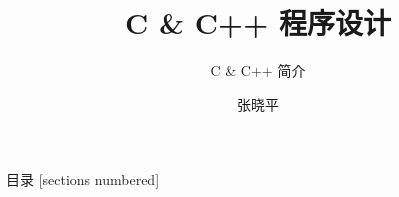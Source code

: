 \documentclass[10pt]{beamer}
\title{C \& C++ 程序设计}
\subtitle{C \& C++ 简介}
\date{}%
\author{张晓平}
\institute{数学与统计学院}
\newcommand\Fontvi{\fontsize{6.5}{7.2}\selectfont}
\begin{document}
\maketitle

\begin{frame}{目录}  
  [sections numbered]
  \tableofcontents[hideallsubsections]
\end{frame}








       
\end{document}
